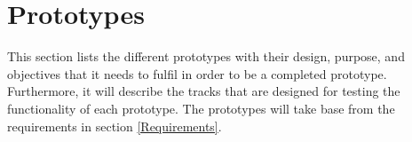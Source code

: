 \section{Prototypes}
This section lists the different prototypes with their design, purpose, and objectives that it needs to fulfil in order to be a completed prototype. Furthermore, it will describe the tracks that are designed for testing the functionality of each prototype. The prototypes will take base from the requirements in section \ref{Requirements}.





